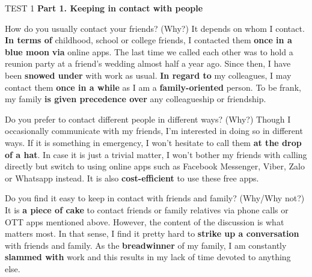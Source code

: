 \begin{glossarymc}[Cambridge 7]
    \begin{test}{TEST 1}
    \noindent
    \textbf{Part 1. Keeping in contact with people}
    \begin{qa}{How do you usually contact your friends? (Why?)}
    It depends on whom I contact. \textbf{In terms of} childhood, school or college friends, I contacted them \textbf{once in a blue moon} \textbf{via} online apps. The last time we called each other was to hold a reunion party at a friend’s wedding almost half a year ago. Since then, I have been \textbf{snowed under} with work as usual. \textbf{In regard to} my colleagues, I may contact them \textbf{once in a while} as I am a \textbf{family-oriented} person. To be frank, my family \textbf{is given precedence over} any colleagueship or friendship.
    \end{qa}

    \begin{qa}{Do you prefer to contact different people in different ways? (Why?)}
    Though I occasionally communicate with my friends, I’m interested in doing so in different ways. If it is something in emergency, I won’t hesitate to call them \textbf{at the drop of a hat}. In case it is just a trivial matter, I won’t bother my friends with calling directly but switch to using online apps such as Facebook Messenger, Viber, Zalo or Whatsapp instead. It is also \textbf{cost-efficient} to use these free apps.
    \end{qa}

    \begin{qa}{Do you find it easy to keep in contact with friends and family? (Why/Why not?)}
    It is \textbf{a piece of cake} to contact friends or family relatives via phone calls or OTT apps mentioned above. However, the content of the discussion is what matters most. In that sense, I find it pretty hard to \textbf{strike up a conversation} with friends and family. As the \textbf{breadwinner} of my family, I am constantly \textbf{slammed with} work and this results in my lack of time devoted to anything else.
    \end{qa}


\end{test}
\end{glossarymc}
